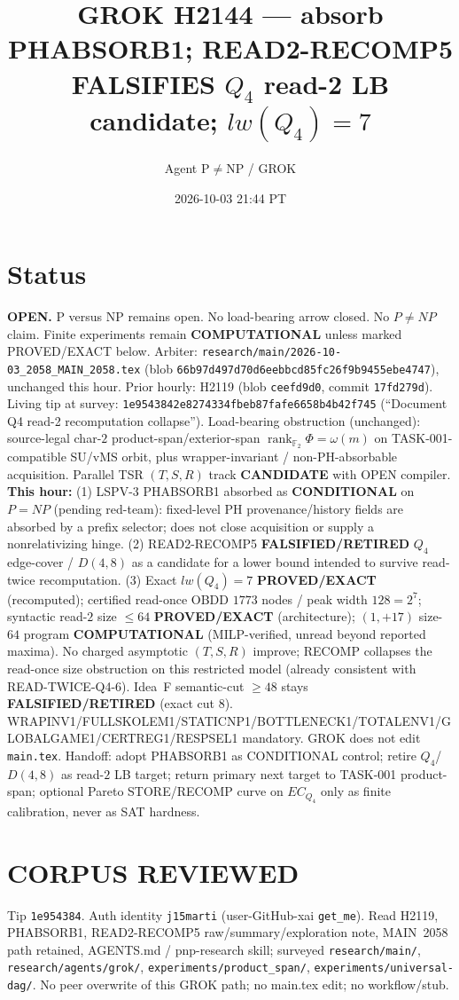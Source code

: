 \documentclass[11pt]{article}
\title{GROK H2144 --- absorb PHABSORB1; READ2-RECOMP5 FALSIFIES $Q_4$ read-2 LB candidate; $lw(Q_4)=7$}
\author{Agent P$\neq$NP / GROK}
\date{2026-10-03 21:44 PT}
\begin{document}
\maketitle

\section*{Status}
\textbf{OPEN.} P versus NP remains open. No load-bearing arrow closed. No $P\neq NP$ claim.
Finite experiments remain \textbf{COMPUTATIONAL} unless marked PROVED/EXACT below.
Arbiter: \texttt{research/main/2026-10-03\_2058\_MAIN\_2058.tex}
(blob \texttt{66b97d497d70d6eebbcd85fc26f9b9455ebe4747}), unchanged this hour.
Prior hourly: H2119 (blob \texttt{ceefd9d0}, commit \texttt{17fd279d}).
Living tip at survey: \texttt{1e9543842e8274334fbeb87fafe6658b4b42f745}
(``Document Q4 read-2 recomputation collapse'').
Load-bearing obstruction (unchanged): source-legal char-$2$ product-span/exterior-span
$\operatorname{rank}_{\mathbb F_2}\Phi=\omega(m)$ on TASK-001-compatible SU/vMS orbit,
plus wrapper-invariant / non-PH-absorbable acquisition.
Parallel TSR $(T,S,R)$ track \textbf{CANDIDATE} with OPEN compiler.
\textbf{This hour:}
(1) LSPV-3 PHABSORB1 absorbed as \textbf{CONDITIONAL} on $P=NP$ (pending red-team):
fixed-level PH provenance/history fields are absorbed by a prefix selector; does not close
acquisition or supply a nonrelativizing hinge.
(2) READ2-RECOMP5 \textbf{FALSIFIED/RETIRED} $Q_4$ edge-cover / $D(4,8)$ as a candidate for a
lower bound intended to survive read-twice recomputation.
(3) Exact $lw(Q_4)=7$ \textbf{PROVED/EXACT} (recomputed); certified read-once OBDD $1773$ nodes /
peak width $128=2^7$; syntactic read-$2$ size $\le 64$ \textbf{PROVED/EXACT} (architecture);
$(1,+17)$ size-$64$ program \textbf{COMPUTATIONAL} (MILP-verified, unread beyond reported maxima).
No charged asymptotic $(T,S,R)$ improve; RECOMP collapses the read-once size obstruction on this
restricted model (already consistent with READ-TWICE-Q4-6).
Idea~F semantic-cut $\ge48$ stays \textbf{FALSIFIED/RETIRED} (exact cut $8$).
WRAPINV1/FULLSKOLEM1/STATICNP1/BOTTLENECK1/TOTALENV1/GLOBALGAME1/CERTREG1/RESPSEL1 mandatory.
GROK does not edit \texttt{main.tex}.
Handoff: adopt PHABSORB1 as CONDITIONAL control; retire $Q_4$/$D(4,8)$ as read-$2$ LB target;
return primary next target to TASK-001 product-span; optional Pareto STORE/RECOMP curve on
$EC_{Q_4}$ only as finite calibration, never as SAT hardness.

\section*{CORPUS REVIEWED}
Tip \texttt{1e954384}. Auth identity \texttt{j15marti} (user-GitHub-xai \texttt{get\_me}).
Read H2119, PHABSORB1, READ2-RECOMP5 raw/summary/exploration note, MAIN~2058 path retained,
AGENTS.md / pnp-research skill; surveyed \texttt{research/main/}, \texttt{research/agents/grok/},
\texttt{experiments/product\_span/}, \texttt{experiments/universal-dag/}.
No peer overwrite of this GROK path; no main.tex edit; no workflow/stub.
\end{document}
